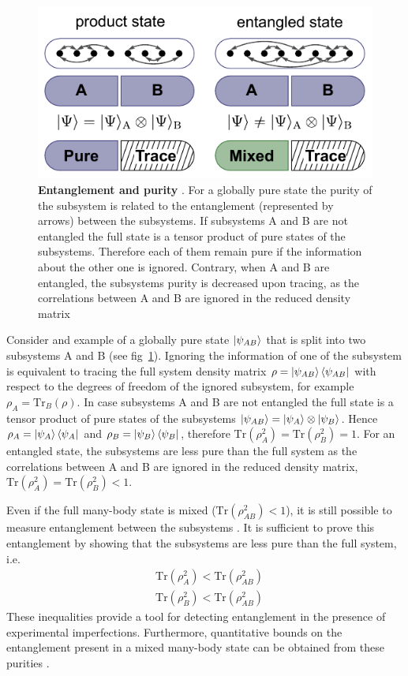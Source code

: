 \begin{figure}[t!]
	\centering
	\includegraphics[scale=1]{figures/ETH_entanglemet.pdf}
	\caption{{\bf Entanglement and purity }. For a globally pure state the purity of the subsystem is related to the entanglement (represented by arrows) between the subsystems. If subsystems A and B are not entangled the full state is a tensor product of pure states of the subsystems. Therefore each of them remain pure if the information about the other one is ignored. Contrary, when A and B are entangled, the subsystems purity is decreased upon tracing, as the correlations between A and B are ignored in the reduced density matrix }
	\label{fig:ETH_entanglemet}
\end{figure}  

Consider and example of a globally pure state $\left|\psi_{AB}\right\rangle$ that is split into two subsystems A and B (see fig~\ref{fig:ETH_entanglemet}). Ignoring the information of one of the subsystem is equivalent to tracing the full system density matrix $\rho = \left|\psi_{AB}\right\rangle\left\langle \psi_{AB}\right|$ with respect to the degrees of freedom of the ignored subsystem, for example $\rho_A =\textrm{Tr}_B(\rho)$. In case subsystems A and B are not entangled the full state is a tensor product of pure states of the subsystems $\left|\psi_{AB}\right\rangle=\left|\psi_{A}\right\rangle\otimes\left|\psi_{B}\right\rangle$. Hence $\rho_{A}= \left|\psi_{A}\right\rangle\left\langle \psi_{A}\right|$ and $\rho_B= \left|\psi_{B}\right\rangle\left\langle \psi_{B}\right|$, therefore $\textrm{Tr}(\rho_A^2)=\textrm{Tr}(\rho_B^2)=1$. For an entangled state, the subsystems are less pure than the full system as the correlations between A and B are ignored in the reduced density matrix, $\textrm{Tr}(\rho_A^2)=\textrm{Tr}(\rho_B^2)<1$.

Even if the full many-body state is mixed ($\textrm{Tr}(\rho_{AB}^2) < 1$), it is still possible to measure entanglement between the subsystems \cite{Horodecki2009}. It is sufficient \cite{Horodecki1996} to prove this entanglement by showing that the subsystems are less pure than the full system, i.e.
\begin{equation}
\begin{aligned}
&\textrm{Tr}(\rho_{A}^2)<\textrm{Tr}(\rho_{AB}^2)    \\
&\textrm{Tr}(\rho_{B}^2)<\textrm{Tr}(\rho_{AB}^2)
\end{aligned}
\end{equation}
These inequalities provide a tool for detecting entanglement in the presence of experimental imperfections. Furthermore, quantitative bounds on the entanglement present in a mixed many-body state can be obtained from these purities \cite{Mintert2007}.

